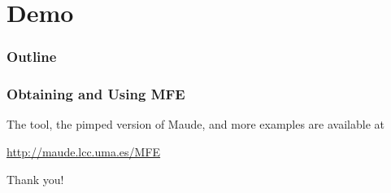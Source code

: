 \documentclass{beamer}
\begin{document}
\section{Demo}

\begin{frame}
  \frametitle{Outline}
  \tableofcontents[currentsection]
\end{frame}

\begin{frame}
  \frametitle{Obtaining and Using MFE}

    The tool, the pimped version of Maude, 
    and more examples are available at 
    \begin{center}
      \textcolor{blue}{\url{http://maude.lcc.uma.es/MFE}}
    \end{center}
    \begin{flushright}
      Thank you!
    \end{flushright}
\end{frame}
\end{document}
